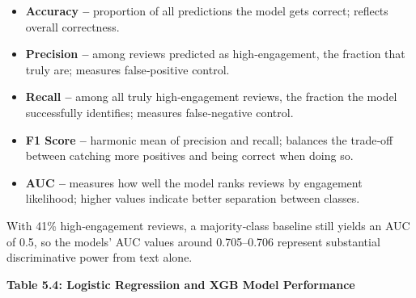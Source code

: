 \begin{itemize}

\item \textbf{Accuracy -- } proportion of all predictions the model gets correct; reflects overall correctness.

\item \textbf{Precision --} among reviews predicted as high‑engagement, the fraction that truly are; measures false‑positive control.

\item \textbf{Recall -- } among all truly high‑engagement reviews, the fraction the model successfully identifies; measures false‑negative control.

\item \textbf{F1 Score -- } harmonic mean of precision and recall; balances the trade‑off between catching more positives and being correct when doing so.

\item \textbf{AUC -- } measures how well the model ranks reviews by engagement likelihood; higher values indicate better separation between classes.

\end{itemize}

With 41\% high‑engagement reviews, a majority‑class baseline still
yields an AUC of 0.5, so the models' AUC values around 0.705--0.706
represent substantial discriminative power from text alone.

\textbf{Table 5.4: Logistic Regressiion and XGB Model Performance}

